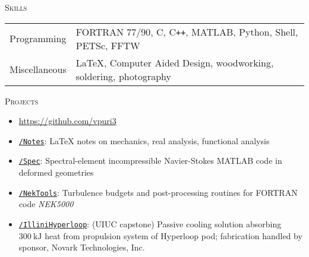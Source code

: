\documentclass[10pt]{article}
\begin{document}
\vspace{-1.5em}
\begin{multicols}{2}
\textsc{\small Skills}
\columnbreak

\begin {table}[H]
\begin{tabular}{l l }
\hspace{-0.5em}Programming   & \hspace{-0.0em} FORTRAN 77/90, C, C\texttt{++}, MATLAB, Python, Shell, PETSc, FFTW\\
\hspace{-0.5em}Miscellaneous & \hspace{-0.0em} \LaTeX{}, Computer Aided Design, woodworking, soldering, photography \\
\end{tabular}	
\end{table}

\end{multicols}
\vspace{-1.5em}
\begin{multicols}{2}
\textsc{\small Projects}
\columnbreak

\vspace{-1.75em}
\begin{itemize}[label=-]
    \setlength{\itemindent}{-1.75em}
    \setlength\itemsep{-0.25em}
    \item[]\hspace{-1.0em} \url{https://github.com/vpuri3}
    \item \href{https://github.com/vpuri3/Notes}{\texttt{/Notes}}: \LaTeX{} notes on mechanics, real analysis, functional analysis
    \item \href{https://github.com/vpuri3/Spec}{\texttt{/Spec}}: Spectral-element incompressible Navier-Stokes MATLAB code in deformed geometries
    \item \href{https://github.com/vpuri3/NekTools}{\texttt{/NekTools}}: Turbulence budgets and post-processing routines for FORTRAN code \textit{NEK5000}
    \item \href{https://github.com/vpuri3/IlliniHyperloop}{\texttt{/IlliniHyperloop}}: (UIUC capstone) Passive cooling solution absorbing $\SI{300}{\kilo \joule}$ heat from propulsion system of Hyperloop pod; fabrication handled by sponsor, Novark Technologies, Inc.
\end{itemize}
\vspace{-2.0em}

\end{multicols}
\vspace{-1.5em}
\vfill
\end{document}
